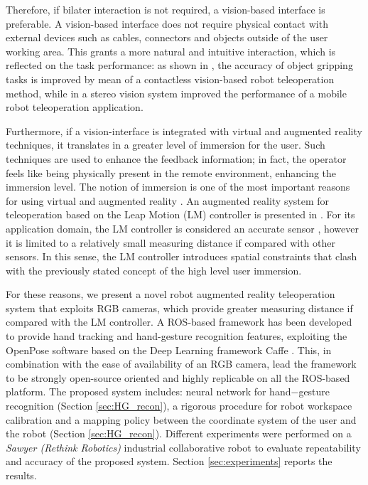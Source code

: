 \documentclass[letterpaper, 10 pt, conference]{ieeeconf}  %
\begin{document}
Therefore, if bilater interaction is not required, a vision-based interface is preferable. A vision-based interface does not require physical contact with external devices such as cables, connectors and objects outside of the user working area. This grants a more natural and intuitive interaction, which is reflected on the task performance: as shown in \cite{Kofman2005}, the accuracy of object gripping tasks is improved by mean of a contactless vision-based robot teleoperation method, while in \cite{Livatino2009} a stereo vision system improved the performance of a mobile robot teleoperation application.

Furthermore, if a vision-interface is integrated with virtual and augmented reality techniques, it translates in a greater level of immersion for the user. Such techniques are used to enhance the feedback information; in fact, the operator feels like being physically present in the remote environment, enhancing the immersion level. The notion of immersion is one of the most important reasons for using virtual and augmented reality \cite{Boboc2012}. An augmented reality system for teleoperation based on the Leap Motion (LM) controller is presented in \cite{Peppoloni2015}. For its application domain, the LM controller is considered an accurate sensor \cite{Hedayati2018}, however it is limited to a relatively small measuring distance if compared with other sensors. In this sense, the LM controller introduces spatial constraints that clash with the previously stated concept of the high level user immersion.

For these reasons, we present a novel robot augmented reality teleoperation system that exploits RGB cameras, which provide greater measuring distance if compared with the LM controller. A ROS-based framework has been developed to provide hand tracking and hand-gesture recognition features, exploiting the OpenPose software \cite{simon2017hand, cao2018openpose} based on the Deep Learning framework Caffe \cite{jia2014caffe}.
This, in combination with the ease of availability of an RGB camera, lead the framework to be strongly open-source oriented and highly replicable on all the ROS-based platform. The proposed system includes: neural network for hand$-$gesture recognition (Section \ref{sec:HG_recon}), a rigorous procedure for robot workspace calibration and a mapping policy between the coordinate system of the user and the robot (Section \ref{sec:HG_recon}). 
Different experiments were performed on a \textit{Sawyer (Rethink Robotics)} industrial collaborative robot to evaluate repeatability and accuracy of the proposed system. Section \ref{sec:experiments} reports the results.
\end{document}
